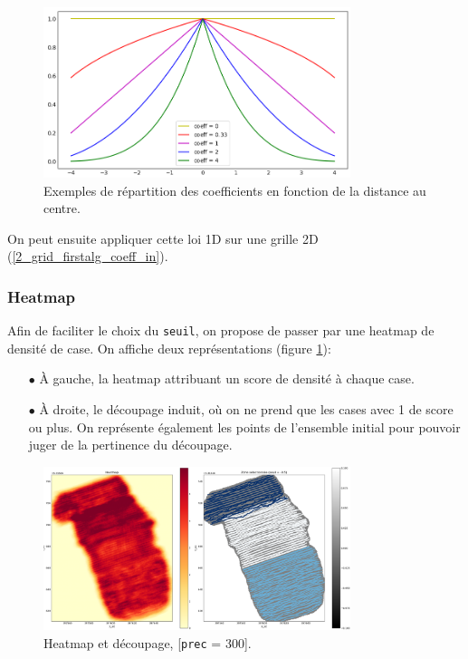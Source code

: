\documentclass[12pt]{article}
\begin{document}
    \begin{figure}[ht!]
        \centering
        \includegraphics[width=0.8\textwidth]{Images/Grid_FirstAlg_CoeffCurve.png}
        \caption{Exemples de répartition des coefficients en fonction de la distance au centre.}
    \end{figure}
    
    \label{2_grid_firstalg_coeff_out} On peut ensuite appliquer cette loi 1D sur une grille 2D (\ref{2_grid_firstalg_coeff_in}).

\subsubsection{Heatmap}

    Afin de faciliter le choix du \texttt{seuil}, on propose de passer par une heatmap de densité de case. On affiche deux représentations (figure \ref{fig:2_heatmap}):

    \begin{enumerate}
        \item[$\bullet$] À gauche, la heatmap attribuant un score de densité à chaque case.
        \item[$\bullet$] À droite, le découpage induit, où on ne prend que les cases avec 1 de score ou plus. On représente également les points de l'ensemble initial pour pouvoir juger de la pertinence du découpage.
    \end{enumerate}

    \begin{figure}[ht!]
        \centering
        \includegraphics[width=0.8\textwidth]{Images/Grid_Heatmap_p300.png}
        \caption{\label{fig:2_heatmap}Heatmap et découpage, [\texttt{prec} = 300].}
    \end{figure}
    
\end{document}
